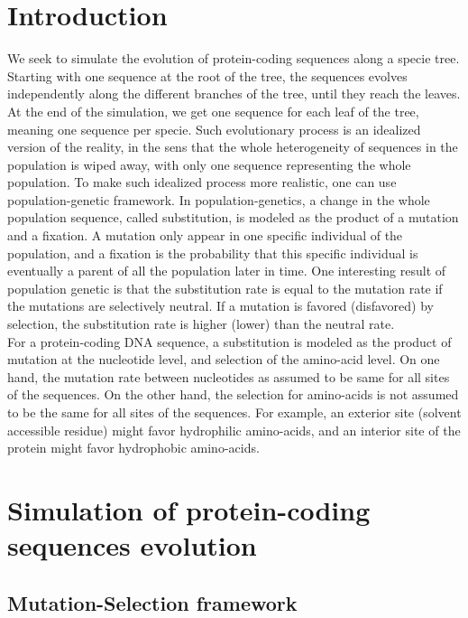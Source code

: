 \documentclass{article}
\begin{document}
	
    \section{Introduction}

    We seek to simulate the evolution of protein-coding sequences along a specie tree.
    Starting with one sequence at the root of the tree, the sequences evolves independently along the different branches of the tree, until they reach the leaves. At the end of the simulation, we get one sequence for each leaf of the tree, meaning one sequence per specie.
    Such evolutionary process is an idealized version of the reality, in the sens that the whole heterogeneity of sequences in the population is wiped away, with only one sequence representing the whole population. To make such idealized process more realistic, one can use population-genetic framework. In population-genetics, a change in the whole population sequence, called substitution, is modeled as the product of a mutation and a fixation. A mutation only appear in one specific individual of the population, and a fixation is the probability that this specific individual is eventually a parent of all the population later in time. One interesting result of population genetic is that the substitution rate is equal to the mutation rate if the mutations are selectively neutral. If a mutation is favored (disfavored) by selection, the substitution rate is higher (lower) than the neutral rate.\\

    For a protein-coding DNA sequence, a substitution is modeled as the product of mutation at the nucleotide level, and selection of the amino-acid level. On one hand, the mutation rate between nucleotides as assumed to be same for all sites of the sequences. On the other hand, the selection for amino-acids is not assumed to be the same for all sites of the sequences. For example, an exterior site (solvent accessible residue) might favor hydrophilic amino-acids, and an interior site of the protein might favor hydrophobic amino-acids.

    \section{Simulation of protein-coding sequences evolution}

    \subsection{Mutation-Selection framework}
\end{document}
